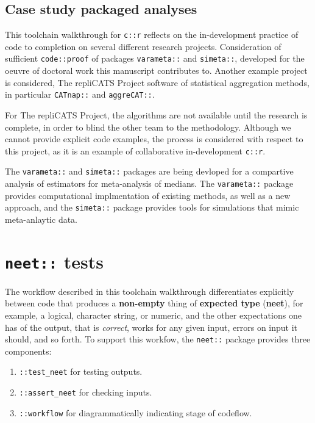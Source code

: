 \documentclass[
]{article}
\providecommand{\tightlist}{%
  \setlength{\itemsep}{0pt}\setlength{\parskip}{0pt}}
\begin{document}
\hypertarget{case-study-packaged-analyses}{%
\subsection{Case study packaged analyses}\label{case-study-packaged-analyses}}

This toolchain walkthrough for \texttt{c::r} reflects on the in-development practice of code to completion on several different research projects. Consideration of sufficient \texttt{code::proof} of packages \texttt{varameta::} and \texttt{simeta::}, developed for the oeuvre of doctoral work this manuscript contributes to. Another example project is considered, The repliCATS Project software of statistical aggregation methods, in particular \texttt{CATnap::} and \texttt{aggreCAT::}.

For The repliCATS Project, the algorithms are not available until the research is complete, in order to blind the other team to the methodology. Although we cannot provide explicit code examples, the process is considered with respect to this project, as it is an example of collaborative in-development \texttt{c::r}.

The \texttt{varameta::} and \texttt{simeta::} packages are being devloped for a compartive analysis of estimators for meta-analysis of medians. The \texttt{varameta::} package provides computational implmentation of existing methods, as well as a new approach, and the \texttt{simeta::} package provides tools for simulations that mimic meta-anlaytic data.

\hypertarget{neet-tests}{%
\section{\texorpdfstring{\texttt{neet::} tests}{neet:: tests}}\label{neet-tests}}

The workflow described in this toolchain walkthrough differentiates explicitly between code that produces a \textbf{non-empty} thing of \textbf{expected type} (\textbf{neet}), for example, a logical, character string, or numeric, and the other expectations one has of the output, that is \emph{correct}, works for any given input, errors on input it should, and so forth. To support this workfow, the \texttt{neet::} package provides three components:

\begin{enumerate}
\def\labelenumi{\arabic{enumi}.}
\tightlist
\item
  \texttt{::test\_neet} for testing outputs.
\item
  \texttt{::assert\_neet} for checking inputs.
\item
  \texttt{::workflow} for diagrammatically indicating stage of codeflow.
\end{enumerate}
\end{document}
